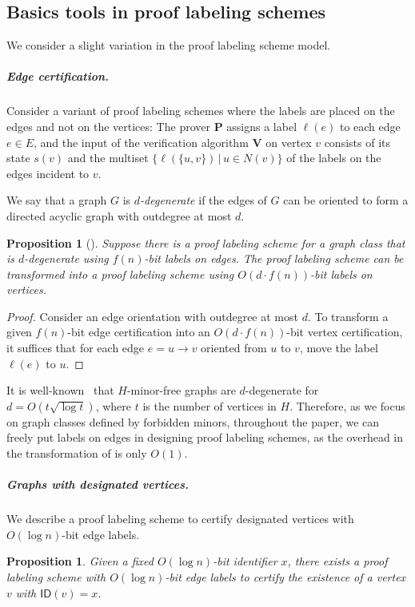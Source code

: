 \documentclass[11pt]{article}
\newtheorem{proposition}[lemma]{Proposition}
\theoremstyle{definition}
\theoremstyle{remark}
\newcommand{\ID}{\mathsf{ID}}
\begin{document}
\subsection{Basics tools in proof labeling schemes}
We consider a slight variation in the proof labeling scheme model.

\subparagraph{Edge certification.} Consider a variant of proof labeling schemes where the labels are placed on the edges and not on the vertices: The prover $\mathbf{P}$ assigns a label $\ell(e)$ to each edge $e \in E$, and the input of the verification algorithm $\mathbf{V}$ on vertex $v$ consists of its state $s(v)$ and the multiset $\{\ell(\{u,v\}) \, | \, u \in N(v)\}$ of the labels on the edges incident to $v$.

We say that a graph $G$ is \emph{$d$-degenerate} if the edges of $G$ can be oriented to form a directed acyclic graph with outdegree at most $d$. 

\begin{proposition}[\cite{feuilloley2023local}]\label{prop:degeneracy}
Suppose there is a proof labeling scheme for a graph class that is $d$-degenerate using $f(n)$-bit labels on edges.
The proof labeling scheme can be transformed into a proof labeling scheme using $O\left(d \cdot f(n)\right)$-bit labels on vertices.
\end{proposition}
\begin{proof}
Consider an edge orientation with outdegree at most $d$. To transform a given $f(n)$-bit edge certification into an $O(d \cdot f(n))$-bit vertex certification, it suffices that for each edge $e = u \rightarrow v$ oriented from $u$ to $v$, move the label $\ell(e)$ to $u$. 
\end{proof}

It is well-known~\cite{THOMASON2001318} that $H$-minor-free graphs are $d$-degenerate for  $d = O\left(t \sqrt{\log t}\right)$, where $t$ is the number of vertices in $H$. Therefore, as we focus on graph classes defined by forbidden minors, throughout the paper, we can freely put labels on edges in designing proof labeling schemes, as the overhead in the transformation of  is only $O(1)$. 

\subparagraph{Graphs with designated vertices.}
We describe a proof labeling scheme to certify designated vertices with $O(\log n)$-bit edge labels.

\begin{proposition}
    \label{vertex-in-graph-edge-pls}
    Given a fixed $O(\log n)$-bit identifier $x$, there exists a proof labeling scheme with $O(\log n)$-bit edge labels to certify the existence of a vertex $v$ with $\ID(v) = x$.  
\end{proposition}
\end{document}
